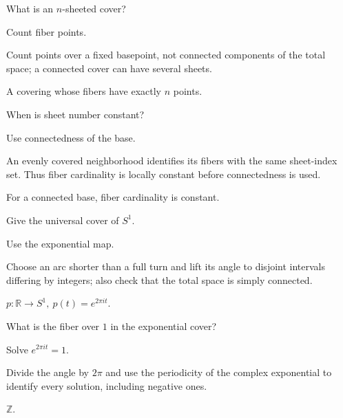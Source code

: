 \begin{exercise}\label{exr:viii10-05}
What is an \(n\)-sheeted cover?
\end{exercise}
\begin{hint}
Count fiber points.

Count points over a fixed basepoint, not connected components of the total space; a connected cover can have several sheets.
\end{hint}
\begin{solution}
A covering whose fibers have exactly \(n\) points.
\end{solution}

\begin{exercise}\label{exr:viii10-06}
When is sheet number constant?
\end{exercise}
\begin{hint}
Use connectedness of the base.

An evenly covered neighborhood identifies its fibers with the same sheet-index set. Thus fiber cardinality is locally constant before connectedness is used.
\end{hint}
\begin{solution}
For a connected base, fiber cardinality is constant.
\end{solution}

\begin{exercise}\label{exr:viii10-07}
Give the universal cover of \(S^1\).
\end{exercise}
\begin{hint}
Use the exponential map.

Choose an arc shorter than a full turn and lift its angle to disjoint intervals differing by integers; also check that the total space is simply connected.
\end{hint}
\begin{solution}
\(p:\mathbb R\to S^1,\ p(t)=e^{2\pi it}\).
\end{solution}

\begin{exercise}\label{exr:viii10-08}
What is the fiber over \(1\) in the exponential cover?
\end{exercise}
\begin{hint}
Solve \(e^{2\pi it}=1\).

Divide the angle by \(2\pi\) and use the periodicity of the complex exponential to identify every solution, including negative ones.
\end{hint}
\begin{solution}
\(\mathbb Z\).
\end{solution}

